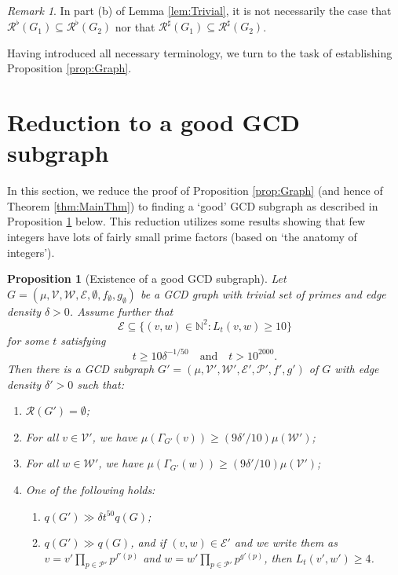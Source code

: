 \documentclass[12pt]{amsart}
\numberwithin{equation}{section}
\newtheorem{prop}[lem]{Proposition}
\theoremstyle{definition}
\theoremstyle{remark}
\newtheorem*{rem}{Remark}
\newcommand{\N}{\mathbb{N}}
\newcommand{\CE}{\mathcal{E}}
\newcommand{\CP}{\mathcal{P}}
\newcommand{\CR}{\mathcal{R}}
\newcommand{\CV}{\mathcal{V}}
\newcommand{\CW}{\mathcal{W}}
\renewcommand{\ge}{\geqslant}
\begin{document}
\begin{rem} In part (b) of Lemma \ref{lem:Trivial}, it is not necessarily the case that $\CR^\flat(G_1)\subseteq\CR^\flat(G_2)$ nor that $\CR^\sharp(G_1)\subseteq \CR^\sharp(G_2)$.
\end{rem}



Having introduced all necessary terminology, we turn to the task of establishing Proposition \ref{prop:Graph}. 


\section{Reduction to a good GCD subgraph}\label{sec:Anatomy}

In this section, we reduce the proof of Proposition \ref{prop:Graph} (and hence of Theorem \ref{thm:MainThm}) to finding a `good' GCD subgraph as described in Proposition \ref{prop:BoundOnEdges} below. This reduction utilizes some results showing that few integers have lots of fairly small prime factors (based on `the anatomy of integers').


\begin{prop}[Existence of a good GCD subgraph]\label{prop:BoundOnEdges}
Let $G=(\mu,\CV,\CW,\CE,\emptyset,f_\emptyset,g_\emptyset)$ be a GCD graph with trivial set of primes and edge density $\delta>0$. Assume further that
\[
\CE\subseteq\{(v,w)\in\N^2 :  L_t(v,w) \ge10\}
\]
for some $t$ satisfying 
\[
t\ge10\delta^{-1/50}\quad\text{and}\quad t> 10^{2000}.
\]
Then there is a GCD subgraph $G'=(\mu,\CV',\CW',\CE',\CP',f',g')$ of $G$ with edge density $\delta'>0$ such that:
\begin{enumerate}[label=(\alph*)]
\item  $\CR(G')=\emptyset$;\label{prop:Parta}
\item For all $v\in\CV'$, we have $\mu(\Gamma_{G'}(v))\ge(9\delta'/10)\mu(\CW')$;\label{prop:Partb}
\item For all $w\in\CW'$, we have $\mu(\Gamma_{G'}(w))\ge(9\delta'/10)\mu(\CV')$;\label{prop:Partc}
\item One of the following holds: \label{prop:Partd}
\begin{enumerate}[label=(\roman*)]
\item \label{prop:Case1}$q(G')\gg \delta t^{50} q(G)$;
\item \label{prop:Case2}$q(G')\gg q(G)$, and if $(v,w)\in\CE'$ and we write them as $v=v'\prod_{p\in\CP'}p^{f'(p)}$ and $w=w'\prod_{p\in\CP'}p^{g'(p)}$, then $L_t(v',w')\ge 4$.
\end{enumerate}
\end{enumerate}
\end{prop}
\end{document}
